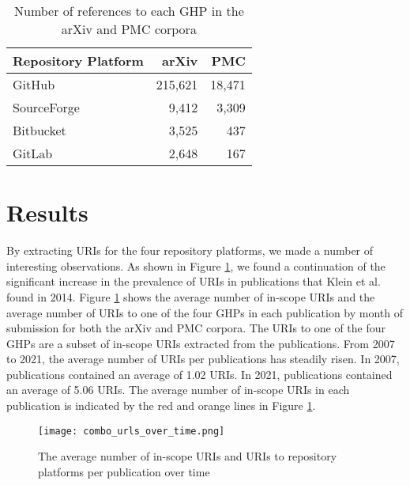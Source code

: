 \begin{table}
    \centering
    \begin{tabular}{|l|r|r|}
    \hline
    Repository Platform & arXiv & PMC\\
    \hline
    GitHub & 215,621 & 18,471\\
    SourceForge & 9,412 & 3,309\\
    Bitbucket & 3,525 & 437\\
    GitLab & 2,648 & 167\\
  \hline
    \end{tabular}
    \caption{Number of references to each GHP in the arXiv and PMC corpora}
    \label{tab:repo_count}
\end{table}

\section{Results}
By extracting URIs for the four repository platforms, we made a number of interesting observations. As shown in Figure \ref{fig:combo_urls}, we found a continuation of the significant increase in the prevalence of URIs in publications that Klein et al. \cite{klein-plos2014} found in 2014. Figure \ref{fig:combo_urls} shows the average number of in-scope URIs and the average number of URIs to one of the four GHPs in each publication by month of submission for both the arXiv and PMC corpora. The URIs to one of the four GHPs are a subset of in-scope URIs extracted from the publications. From 2007 to 2021, the average number of URIs per publications has steadily risen. In 2007, publications contained an average of 1.02 URIs. In 2021, publications contained an average of 5.06 URIs. The average number of in-scope URIs in each publication is indicated by the red and orange lines in Figure \ref{fig:combo_urls}. 

\begin{figure}
    \centering
    \texttt{[image: combo\_urls\_over\_time.png]}
    \caption{The average number of in-scope URIs and URIs to repository platforms per publication over time}
    \label{fig:combo_urls}
\end{figure}

